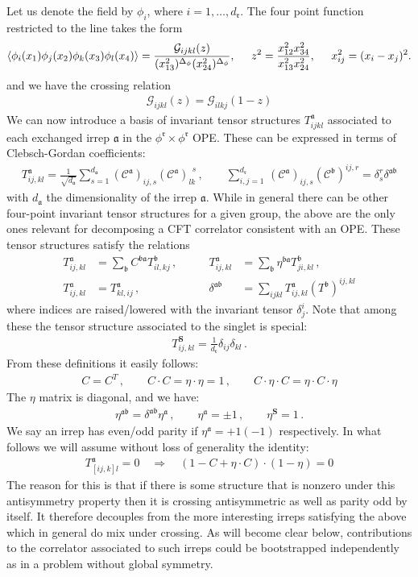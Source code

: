 \documentclass[12pt]{article}
\numberwithin{equation}{section}
\newcommand{\bea}{\begin{eqnarray}}
\newcommand{\eea}{\end{eqnarray}}
\newcommand{\ba}{\begin{equation}\begin{aligned}}
\newcommand{\ea}{\end{aligned}\end{equation}}
\newcommand{\mbf}{\mathbf}
\newcommand{\mf}[1]{\mathfrak #1}
\begin{document}
	Let us denote the field by $\phi_i$, where $i=1,\ldots,d_{\mf r}$. The four point function restricted to the line takes the form
	\begin{align}\label{4ptdef}
	\langle \phi_i (x_1) \phi_j (x_2) \phi_k (x_3)
	\phi_l (x_4) \rangle = \frac{\mathcal{G}_{ijkl}(z)}{(x_{13}^2)^{\Delta_{\phi}}
		(x_{24}^2)^{\Delta_{\phi}}}, \hspace{0.5cm}z^2 = \frac{x_{12}^2 x_{34}^2}{x_{13}^2 x_{24}^2}, \hspace{0.5cm}x_{ij}^2=(x_i-x_j)^2.
	\end{align}
	and we have the crossing relation
	\bea
	\mathcal G_{ijkl}(z)=\mathcal G_{ilkj}(1-z)
	\eea
	We can now introduce a basis of invariant tensor structures $T^{\mf a}_{ijkl}$ associated to each exchanged irrep $\mf a$ in the $\phi^{\mf r} \times \phi^{\mf r}$ OPE. These can be expressed in terms of Clebsch-Gordan coefficients:
	\ba
	T^{\mf a}_{ij,kl}=\frac{1}{\sqrt{d_{\mf a}}}\sum_{s=1}^{d_{\mf a}}  (\mathcal C^{\mf a})_{ij,s}  (\mathcal C^{\mf a})_{ lk}^{\ \ s}\,,\qquad \sum_{i,j=1}^{d_{\mf r}}\,  (\mathcal C^{\mf a})_{ij,s} (\mathcal C^{\mf b})^{ij,r}=\delta_{s}^r \delta^{\mf a \mf b}
	\ea
	with $d_{\mf a}$ the dimensionality of the irrep $\mf a$. While in general there can be other four-point invariant tensor structures for a given group, the above are the only ones relevant for decomposing a CFT correlator consistent with an OPE. These tensor structures satisfy the relations
	\ba
	T^{\mf a}_{ij,kl}&= \sum_{\mf b} C^{\mf b \mf a} T^{\mf b}_{il,kj}\,,& \qquad T^{\mf a}_{ij,kl}&=\sum_{\mf b} \eta^{\mf b \mf a} T^{\mf b}_{ji,kl}\,,\\
	T_{ij,kl}^{\mf a}&=T_{kl,ij}^{\mf a}\,,& \qquad \mathcal \delta^{\mf a \mf b}&=\sum_{ijkl} T^{\mf a}_{ij,kl}(T^{\mf b})^{ij,kl}
	\ea
	where indices are raised/lowered with the invariant tensor $\delta^{i}_j$.
	Note that among these the tensor structure associated to the singlet is special:
	\ba
	T^{\mbf S}_{ij,kl}=\frac{1}{d_{\mf r}} \delta_{ij}\delta_{kl}\,.
	\ea
	From these definitions it easily follows:
	\ba
	C=C^{T}\,,\qquad C\cdot C=\eta\cdot\eta=1\,, \qquad C\cdot \eta\cdot C=\eta\cdot C\cdot \eta
	\ea
	The $\eta$ matrix is diagonal, and we have: 
	\bea
	\eta^{\mf a \mf b}=\delta^{\mf a \mf b} \eta^{\mf a}\,, \qquad \eta^\mf a=\pm 1\,, \qquad \eta^{\mbf S}=1\,.
	\eea
	We say an irrep has even/odd parity if $\eta^{\mf a}=+1(-1)$ respectively. In what follows we will assume without loss of generality the identity:
	\bea
	T^{\mf a}_{[ij,k]l}=0 \quad \Rightarrow \quad (1-C+\eta\cdot C)\cdot (1-\eta)=0 \label{eq:parityoddid}
	\eea
	The reason for this is that if there is some structure that is nonzero under this antisymmetry property then it is crossing antisymmetric as well as parity odd by itself. It therefore decouples from the more interesting irreps satisfying the above which in general do mix under crossing. As will become clear below, contributions to the correlator associated to such irreps could be bootstrapped independently as in a problem without global symmetry.
	
\end{document}
